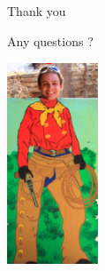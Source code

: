 \documentclass[compress,red]{beamer}
\begin{document}
\subsection{}
\begin{frame}{Thank you}

    \begin{center}
    Any questions ?
    \end{center}

    
    \begin{center}
    \includegraphics[height=6.0cm]{misc/maciek_questions.png}
    \end{center}

\end{frame}
\end{document}
